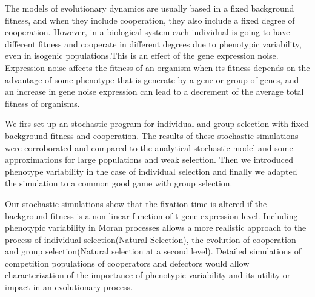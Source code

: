 


\begin{abstracts}        %

The models of evolutionary dynamics are usually based in a fixed background fitness, and when they include cooperation, they also include a fixed degree of cooperation. However, in a biological system each individual is going to have different fitness and cooperate in different degrees due to phenotypic variability, even in isogenic populations.This is an effect of the gene expression noise. Expression noise affects the fitness of an organism when its fitness depends on the advantage of some phenotype that is generate by a gene or group of genes, and an increase in gene noise expression can lead to a decrement of the average total fitness of organisms.\par
We firs set up an stochastic program for individual and group selection with fixed background fitness and cooperation. The results of these stochastic simulations were corroborated and compared to the analytical stochastic model and some approximations for large populations and weak selection. Then we introduced phenotype variability in the case of individual selection and finally we adapted the simulation to a common good game with group selection.\par
 Our stochastic simulations show that the fixation time is altered if the background fitness is a non-linear function of t gene expression level. Including phenotypic variability in Moran processes allows a more realistic approach to the process of individual selection(Natural Selection), the evolution of
cooperation and group selection(Natural selection at a second level). Detailed simulations of competition populations of cooperators and defectors would allow characterization of the importance of phenotypic variability and its utility or impact in an evolutionary process.       



\end{abstracts}




